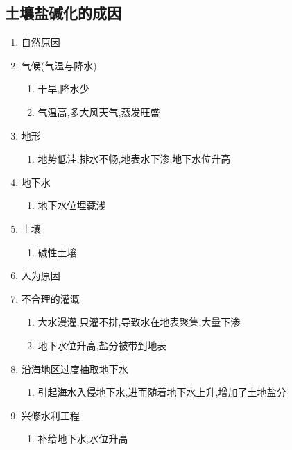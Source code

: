 \documentclass[a4paper]{article}
\begin{document}
    \subsection{土壤盐碱化的成因}
    \begin{enumerate}
        \item 自然原因
            \item 气候(气温与降水)
            \begin{enumerate}
                \item 干旱,降水少
                \item 气温高,多大风天气,蒸发旺盛
            \end{enumerate}
            \item 地形
            \begin{enumerate}
                \item 地势低洼,排水不畅,地表水下渗,地下水位升高
            \end{enumerate}
            \item 地下水
            \begin{enumerate}
                \item 地下水位埋藏浅
            \end{enumerate}
            \item 土壤
            \begin{enumerate}
                \item 碱性土壤
            \end{enumerate}
        \item 人为原因
            \item 不合理的灌溉
            \begin{enumerate}
                \item 大水漫灌,只灌不排,导致水在地表聚集,大量下渗
                \item 地下水位升高,盐分被带到地表
            \end{enumerate}
            \item 沿海地区过度抽取地下水
            \begin{enumerate}
                \item 引起海水入侵地下水,进而随着地下水上升,增加了土地盐分
            \end{enumerate}
            \item 兴修水利工程
            \begin{enumerate}
                \item 补给地下水,水位升高
            \end{enumerate}

\end{enumerate}
\end{document}
